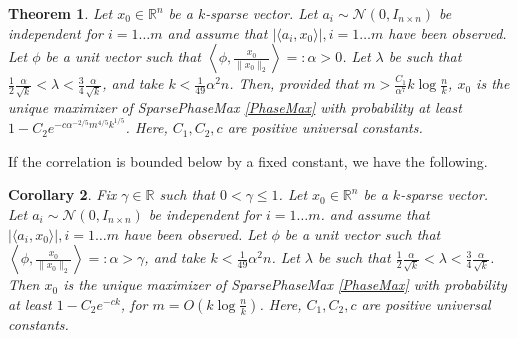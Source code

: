 \documentclass[12pt]{article}
\newcommand{\1}{\mathbf{1}}
\newcommand{\xo}{x_0}
\newcommand{\R}{\mathbb{R}}
\newtheorem{theorem}{Theorem} %
\newtheorem{corollary}[theorem]{Corollary}
\begin{document}
\begin{theorem} \label{thm:sparsephasemax-smallalpha}
Let $\xo \in \R^n$ be a $k$-sparse vector. Let $a_i \sim \mathcal{N}(0, I_{n \times n})$ be independent for $i = 1 \ldots m$ and assume that $|\langle a_i, x_0 \rangle |, i = 1\ldots m$ have been observed. Let $\phi$ be a unit vector such that $\left \langle \phi, \frac{\xo}{\| \xo \|_2} \right \rangle =: \alpha >0$.  Let $\lambda$  be such that $\frac{1}{2} \frac{\alpha}{\sqrt{k}} < \lambda < \frac{3}{4}  \frac{\alpha}{\sqrt{k}}$, and take ${k < \frac{1}{49} \alpha^2 n}$. Then, provided that $m > \frac{C_1}{\alpha^7} k \log \frac{n}{k}$, $\xo$ is the unique maximizer of SparsePhaseMax \eqref{PhaseMax} with probability at least $1 - C_2 e^{-c \alpha^{-2/5} m^{4/5} k^{1/5} }$.  Here, $C_1, C_2, c$ are positive universal constants. 
\end{theorem}

If the correlation is bounded below by a fixed constant, we have the following.

\begin{corollary} \label{cor:sparsephasemax-smallalpha}
Fix $\gamma\in \R$ such that $0 < \gamma \leq 1$.  Let $\xo \in \R^n$ be a $k$-sparse vector. Let $a_i \sim \mathcal{N}(0, I_{n \times n})$ be independent for $i = 1 \ldots m$. and assume that $|\langle a_i, x_0 \rangle |, i = 1 \ldots m$ have been observed.  Let $\phi$ be a unit vector such that $\left \langle \phi, \frac{\xo}{\| \xo \|_2} \right \rangle=: \alpha > \gamma$, and take $k < \frac{1}{49}\alpha^2 n$.  Let $\lambda$ be such that $\frac{1}{2} \frac{\alpha}{\sqrt{k}} < \lambda < \frac{3}{4}  \frac{\alpha}{\sqrt{k}}$. Then $\xo$ is the unique maximizer of SparsePhaseMax \eqref{PhaseMax} with probability at least $1 - C_2 e^{-c  k}$, for $m = O(k \log \frac{n}{k})$.  Here, $C_1, C_2, c$ are positive universal constants. 
\end{corollary}
\end{document}
